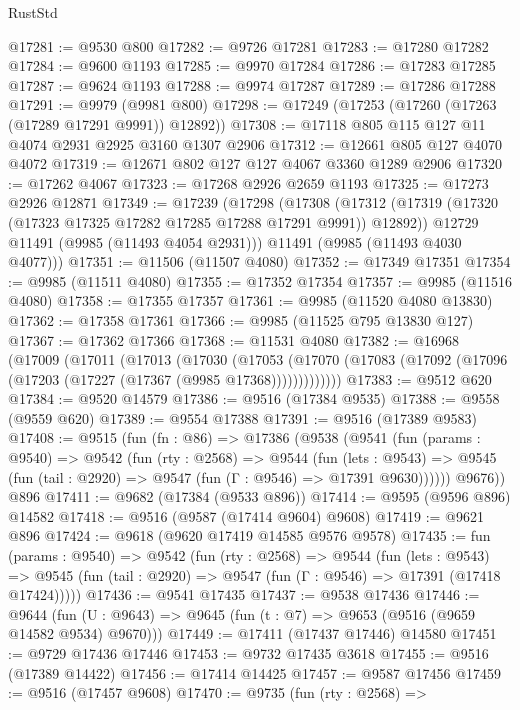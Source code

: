 \begin{lexlean}{RustStd}
\begin{coremodule}
@17281 := @9530 @800
@17282 := @9726 @17281
@17283 := @17280 @17282
@17284 := @9600 @1193
@17285 := @9970 @17284
@17286 := @17283 @17285
@17287 := @9624 @1193
@17288 := @9974 @17287
@17289 := @17286 @17288
@17291 := @9979 (@9981 @800)
@17298 := @17249 (@17253 (@17260 (@17263 (@17289 @17291 @9991)) @12892))
@17308 := @17118 @805 @115 @127 @11 @4074 @2931 @2925 @3160 @1307 @2906
@17312 := @12661 @805 @127 @4070 @4072
@17319 := @12671 @802 @127 @127 @4067 @3360 @1289 @2906
@17320 := @17262 @4067
@17323 := @17268 @2926 @2659 @1193
@17325 := @17273 @2926 @12871
@17349 := @17239
    (@17298
      (@17308
        (@17312 (@17319 (@17320 (@17323 @17325 @17282 @17285 @17288 @17291 @9991)) @12892))
        @12729
        @11491
        (@9985 (@11493 @4054 @2931)))
      @11491
      (@9985 (@11493 @4030 @4077)))
@17351 := @11506 (@11507 @4080)
@17352 := @17349 @17351
@17354 := @9985 (@11511 @4080)
@17355 := @17352 @17354
@17357 := @9985 (@11516 @4080)
@17358 := @17355 @17357
@17361 := @9985 (@11520 @4080 @13830)
@17362 := @17358 @17361
@17366 := @9985 (@11525 @795 @13830 @127)
@17367 := @17362 @17366
@17368 := @11531 @4080
@17382 := @16968
    (@17009
      (@17011
        (@17013
          (@17030
            (@17053
              (@17070 (@17083 (@17092 (@17096 (@17203 (@17227 (@17367 (@9985 @17368)))))))))))))
@17383 := @9512 @620
@17384 := @9520 @14579
@17386 := @9516 (@17384 @9535)
@17388 := @9558 (@9559 @620)
@17389 := @9554 @17388
@17391 := @9516 (@17389 @9583)
@17408 := @9515
    (fun (fn : @86) =>
    @17386
      (@9538
        (@9541
          (fun (params : @9540) =>
          @9542
            (fun (rty : @2568) =>
            @9544
              (fun (lets : @9543) =>
              @9545 (fun (tail : @2920) => @9547 (fun (Γ : @9546) => @17391 @9630))))))
        @9676))
    @896
@17411 := @9682 (@17384 (@9533 @896))
@17414 := @9595 (@9596 @896) @14582
@17418 := @9516 (@9587 (@17414 @9604) @9608)
@17419 := @9621 @896
@17424 := @9618 (@9620 @17419 @14585 @9576 @9578)
@17435 := fun (params : @9540) =>
  @9542
    (fun (rty : @2568) =>
    @9544
      (fun (lets : @9543) =>
      @9545 (fun (tail : @2920) => @9547 (fun (Γ : @9546) => @17391 (@17418 @17424)))))
@17436 := @9541 @17435
@17437 := @9538 @17436
@17446 := @9644
    (fun (U : @9643) => @9645 (fun (t : @7) => @9653 (@9516 (@9659 @14582 @9534) @9670)))
@17449 := @17411 (@17437 @17446) @14580
@17451 := @9729 @17436 @17446
@17453 := @9732 @17435 @3618
@17455 := @9516 (@17389 @14422)
@17456 := @17414 @14425
@17457 := @9587 @17456
@17459 := @9516 (@17457 @9608)
@17470 := @9735
    (fun (rty : @2568) =>

\end{coremodule}
\end{lexlean}
